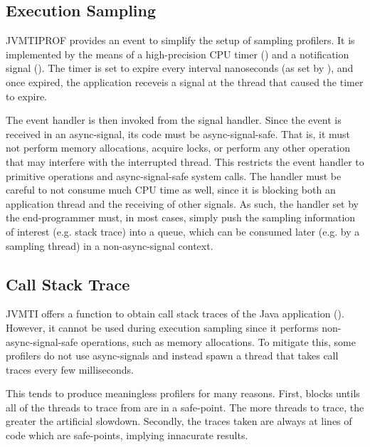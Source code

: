

\subsection{Execution Sampling}

JVMTIPROF provides an event to simplify the setup of sampling profilers. It is implemented by the means of a high-precision CPU timer () and a notification signal (). The timer is set to expire every interval nanoseconds (as set by ), and once expired, the application receveis a signal at the thread that caused the timer to expire.

The event handler is then invoked from the signal handler. Since the event is received in an async-signal, its code must be async-signal-safe. That is, it must not perform memory allocations, acquire locks, or perform any other operation that may interfere with the interrupted thread. This restricts the event handler to primitive operations and async-signal-safe system calls. The handler must be careful to not consume much CPU time as well, since it is blocking both an application thread and the receiving of other signals. As such, the handler set by the end-programmer must, in most cases, simply push the sampling information of interest (e.g. stack trace) into a queue, which can be consumed later (e.g. by a sampling thread) in a non-async-signal context.


\subsection{Call Stack Trace} \label{sec:impl_callstacktrace}

JVMTI offers a function to obtain call stack traces of the Java application (). However, it cannot be used during execution sampling since it performs non-async-signal-safe operations, such as memory allocations. To mitigate this, some profilers do not use async-signals and instead spawn a thread that takes call traces every few milliseconds.

This tends to produce meaningless profilers for many reasons. First,  blocks untils all of the threads to trace from are in a safe-point. The more threads to trace, the greater the artificial slowdown. Secondly, the traces taken are always at lines of code which are safe-points, implying innacurate results.

